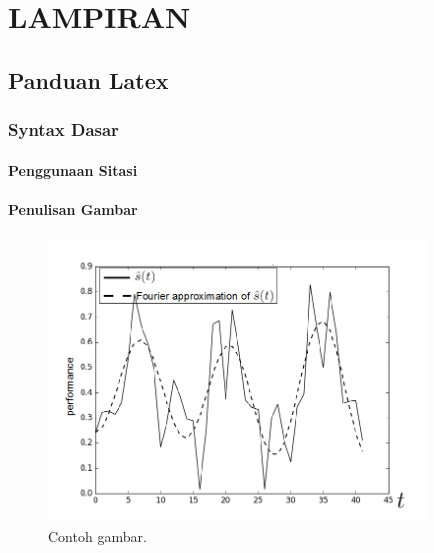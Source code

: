 \chapter*{LAMPIRAN}

\section{Panduan Latex}

\subsection{Syntax Dasar}



\subsubsection{Penggunaan Sitasi}

\subsubsection{Penulisan Gambar}

\begin{figure}[h]
	\centering
	\includegraphics[width=10cm]{contents/chapter-1/sample-fig.png}
	\caption{Contoh gambar.}
	\label{Fig: Contoh gambar}
\end{figure}


